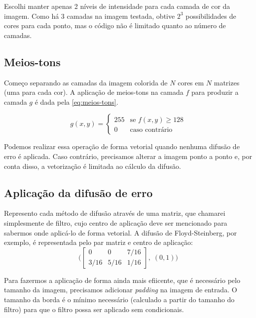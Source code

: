 \documentclass[brazilian,a4paper,twocolumn]{article}
\begin{document}
    Escolhi manter apenas 2 níveis de intensidade para cada camada de cor da imagem. Como há 3 camadas na imagem testada, obtive $ 2^3 $ possibilidades de cores para cada ponto, mas o código não é limitado quanto ao número de camadas.

    \subsection{Meios-tons}

        Começo separando as camadas da imagem colorida de $N$ cores em $N$ matrizes (uma para cada cor). A aplicação de meios-tons na camada $f$ para produzir a camada $g$ é dada pela \cref{eq:meios-tons}.

        \begin{equation}
        \label{eq:meios-tons}
            g(x, y) =
            \begin{cases}
                255     & \text{se $f(x, y) \geq 128$} \\
                0       & \text{caso contrário}
            \end{cases}
        \end{equation}

        Podemos realizar essa operação de forma vetorial quando nenhuma difusão de erro é aplicada. Caso contrário, precisamos alterar a imagem ponto a ponto e, por conta disso, a vetorização é limitada ao cálculo da difusão.

    \subsection{Aplicação da difusão de erro}

        Represento cada método de difusão através de uma matriz, que chamarei simplesmente de filtro, cujo centro de aplicação deve ser mencionado para sabermos onde aplicá-lo de forma vetorial. A difusão de Floyd-Steinberg, por exemplo, é representada pelo par matriz e centro de aplicação:
        \begin{equation*}
            \Bigg(
            \begin{bmatrix}
                0 & 0 & 7/16 \\
                3/16 & 5/16 & 1/16
            \end{bmatrix}
            ,\; (0, 1)
            \Bigg)
        \end{equation*}

        Para fazermos a aplicação de forma ainda mais efiicente, que é necessário pelo tamanho da imagem, precisamos adicionar \textit{padding} na imagem de entrada. O tamanho da borda é o mínimo necessário (calculado a partir do tamanho do filtro) para que o filtro possa ser aplicado sem condicionais.
\end{document}
